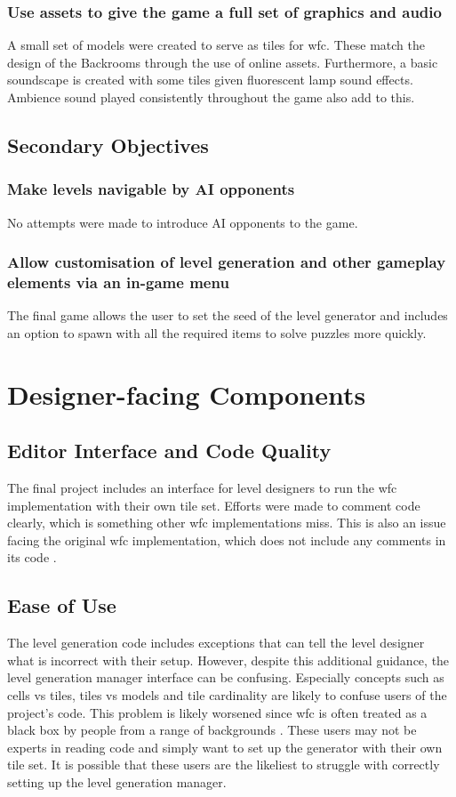 \subsubsection{Use assets to give the game a full set of graphics and audio}
A small set of models were created to serve as tiles for \acrshort{wfc}. These match the design of the Backrooms through the use of online assets. Furthermore, a basic soundscape is created with some tiles given fluorescent lamp sound effects. Ambience sound played consistently throughout the game also add to this.%

\subsection{Secondary Objectives}
\subsubsection{Make levels navigable by AI opponents}
No attempts were made to introduce AI opponents to the game.

\subsubsection{Allow customisation of level generation and other gameplay elements via an in-game menu}
The final game allows the user to set the seed of the level generator and includes an option to spawn with all the required items to solve puzzles more quickly.

\section{Designer-facing Components}
\subsection{Editor Interface and Code Quality}
The final project includes an interface for level designers to run the \acrshort{wfc} implementation with their own tile set. Efforts were made to comment code clearly, which is something other \acrshort{wfc} implementations miss. This is also an issue facing the original \acrshort{wfc} implementation, which does not include any comments in its code \cite{Gumin_Wave_Function_Collapse_2016}.

\subsection{Ease of Use}
The level generation code includes exceptions that can tell the level designer what is incorrect with their setup. However, despite this additional guidance, the level generation manager interface can be confusing. Especially concepts such as cells vs tiles, tiles vs models and tile cardinality are likely to confuse users of the project's code. This problem is likely worsened since \acrshort{wfc} is often treated as a black box by people from a range of backgrounds \cite{WFC_In_The_Wild}. These users may not be experts in reading code and simply want to set up the generator with their own tile set. It is possible that these users are the likeliest to struggle with correctly setting up the level generation manager.

